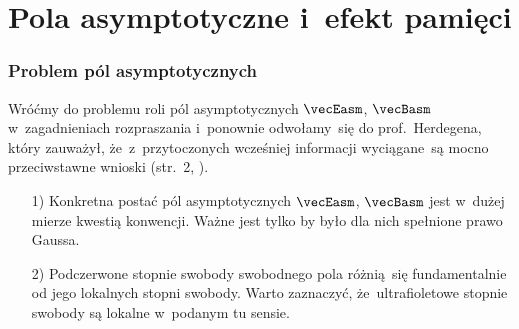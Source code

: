 \documentclass[10pt,t]{beamer}
\begin{document}
\section{Pola asymptotyczne i~efekt pamięci}



\begin{frame}
  \frametitle{Problem pól asymptotycznych}


  Wróćmy do problemu roli pól asymptotycznych $\vecEasm$, $\vecBasm$
  w~zagadnieniach rozpraszania i~ponownie odwołamy~się do
  prof.~Herdegena, który zauważył, że~z~przytoczonych wcześniej informacji
  wyciągane~są mocno przeciwstawne wnioski (str.~2,
  \parencite{Herdegen-Infrared-structure-beyond-locality-ETC-Ver-2024}).

  \begin{itemize}

  \item[1)] Konkretna postać pól asymptotycznych $\vecEasm$, $\vecBasm$
    jest w~dużej mierze kwestią konwencji. Ważne jest tylko by było
    dla nich spełnione prawo Gaussa.

  \item[2)] Podczerwone stopnie swobody swobodnego pola różnią~się
    fundamentalnie od jego lokalnych stopni swobody. Warto zaznaczyć,
    że~ultrafioletowe stopnie swobody są lokalne w~podanym tu sensie.

  \end{itemize}

\end{frame}
\end{document}
